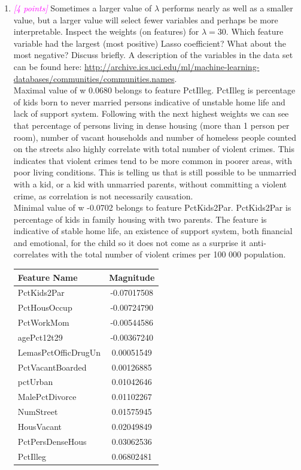 \documentclass{article}
\newcommand{\1}{\mathbf{1}}
\newcommand{\points}[1]{\small\textcolor{magenta}{\emph{[#1 points]}} \normalsize}
\begin{document}
\begin{enumerate}
    \newpage
    \item \points{4} Sometimes a larger value of $\lambda$ performs nearly as well as a smaller value, but a larger value will select fewer variables and perhaps be more interpretable. Inspect the weights (on features) for $\lambda = 30$. Which feature variable had the largest (most positive) Lasso coefficient? What about the most negative? Discuss briefly. A description of the variables in the data set can be found here: \url{http://archive.ics.uci.edu/ml/machine-learning-databases/communities/communities.names}. \\
    
    Maximal value of w 0.0680 belongs to feature PctIlleg. PctIlleg is percentage of kids born to never married persons indicative of unstable home life and lack of support system. Following with the next highest weights we can see that percentage of persons living in dense housing (more than 1 person per room), number of vacant households and number of homeless people counted on the streets also highly correlate with total number of violent crimes. This indicates that violent crimes tend to be more common in poorer areas, with poor living conditions. This is telling us that is still possible to be unmarried with a kid, or a kid with unmarried parents, without committing a violent crime, as correlation is not necessarily causation.  \\
    Minimal value of w -0.0702 belongs to feature PctKids2Par. PctKids2Par is percentage of kids in family housing with two parents. The feature is indicative of stable home life, an existence of support system, both financial and emotional, for the child so it does not come as a surprise it anti-correlates with the total number of violent crimes per 100 000 population. 

    \begin{table}[h!]
    \centering
        \begin{tabular}{l|c}
        \centering
            Feature Name              &  Magnitude \\
            \hline
            PctKids2Par               & -0.07017508 \\
            PctHousOccup              & -0.00724790 \\
            PctWorkMom                & -0.00544586 \\
            agePct12t29               & -0.00367240 \\
            LemasPctOfficDrugUn       & 0.00051549 \\
            PctVacantBoarded          & 0.00126885 \\
            pctUrban                  & 0.01042646 \\
            MalePctDivorce            & 0.01102267 \\
            NumStreet                 & 0.01575945 \\
            HousVacant                & 0.02049849 \\
            PctPersDenseHous          & 0.03062536 \\
            PctIlleg                  & 0.06802481


\end{tabular}
\end{table}
\end{enumerate}
\end{document}
